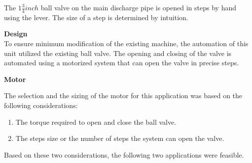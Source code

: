 \par
The $1 \frac{3}{4} inch $ ball valve on the main discharge pipe is opened in steps by hand using the lever. The size of a step is determined by intuition.
\par
\textbf{Design}\\
To ensure minimum modification of the existing machine, the automation of this unit utilized the existing ball valve. The opening and closing of the valve is automated using a motorized system that can open the valve in precise steps.
\par
\textbf{Motor}
\par
The selection and the sizing of the motor for this application was based on the following considerations:

\begin{enumerate}
    \item The torque required to open and close the ball valve.
    \item The steps size or the number of steps the system can open the valve.
\end{enumerate}
\par
Based on these two considerations, the following two applications were feasible.
